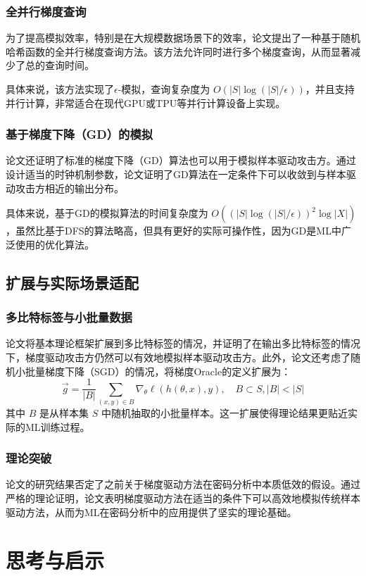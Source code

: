 \documentclass{article}
\newcommand{\grad}{\nabla}
\begin{document}
\subsubsection{全并行梯度查询}
为了提高模拟效率，特别是在大规模数据场景下的效率，论文提出了一种基于随机哈希函数的全并行梯度查询方法。该方法允许同时进行多个梯度查询，从而显著减少了总的查询时间。

具体来说，该方法实现了\(\epsilon\)-模拟，查询复杂度为 \( O(|S| \log(|S|/\epsilon)) \)，并且支持并行计算，非常适合在现代GPU或TPU等并行计算设备上实现。

\subsubsection{基于梯度下降（GD）的模拟}
论文还证明了标准的梯度下降（GD）算法也可以用于模拟样本驱动攻击方。通过设计适当的时钟机制参数，论文证明了GD算法在一定条件下可以收敛到与样本驱动攻击方相近的输出分布。

具体来说，基于GD的模拟算法的时间复杂度为 \( O((|S| \log(|S|/\epsilon))^2 \log |X|) \)，虽然比基于DFS的算法略高，但具有更好的实际可操作性，因为GD是ML中广泛使用的优化算法。

\subsection{扩展与实际场景适配}
\subsubsection{多比特标签与小批量数据}
论文将基本理论框架扩展到多比特标签的情况，并证明了在输出多比特标签的情况下，梯度驱动攻击方仍然可以有效地模拟样本驱动攻击方。此外，论文还考虑了随机小批量梯度下降（SGD）的情况，将梯度Oracle的定义扩展为：
\[
\vec{g} = \frac{1}{|B|} \sum_{(x, y) \in B} \grad_{\theta} \ell(h(\theta, x), y), \quad B \subset S, |B| < |S|
\]
其中 \( B \) 是从样本集 \( S \) 中随机抽取的小批量样本。这一扩展使得理论结果更贴近实际的ML训练过程。

\subsubsection{理论突破}
论文的研究结果否定了之前关于梯度驱动方法在密码分析中本质低效的假设。通过严格的理论证明，论文表明梯度驱动方法在适当的条件下可以高效地模拟传统样本驱动方法，从而为ML在密码分析中的应用提供了坚实的理论基础。


\section{思考与启示}
\end{document}
